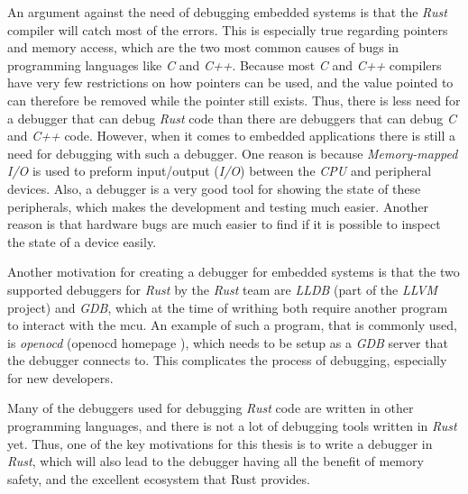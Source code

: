 An argument against the need of debugging embedded systems is that the \emph{Rust} compiler will catch most of the errors.
This is especially true regarding pointers and memory access, which are the two most common causes of bugs in programming languages like \emph{C} and \emph{C++}.
Because most \emph{C} and \emph{C++} compilers have very few restrictions on how pointers can be used, and the value pointed to can therefore be removed while the pointer still exists. 
Thus, there is less need for a debugger that can debug \emph{Rust} code than there are debuggers that can debug \emph{C} and \emph{C++} code.
However, when it comes to embedded applications there is still a need for debugging with such a debugger.
One reason is because \emph{Memory-mapped I/O} is used to preform input/output (\emph{I/O}) between the \emph{CPU} and peripheral devices.
Also, a debugger is a very good tool for showing the state of these peripherals, which makes the development and testing much easier.
Another reason is that hardware bugs are much easier to find if it is possible to inspect the state of a device easily.


Another motivation for creating a debugger for embedded systems is that the two supported debuggers for \emph{Rust} by the \emph{Rust} team are \emph{LLDB} (part of the \emph{LLVM} project) and \emph{GDB}, which at the time of writhing both require another program to interact with the \gls{mcu}.
An example of such a program, that is commonly used, is \emph{openocd} (openocd homepage \cite{openocd}), which needs to be setup as a \emph{GDB} server that the debugger connects to.
This complicates the process of debugging, especially for new developers.


Many of the debuggers used for debugging \emph{Rust} code are written in other programming languages, and there is not a lot of debugging tools written in \emph{Rust} yet.
Thus, one of the key motivations for this thesis is to write a debugger in \emph{Rust}, which will also lead to the debugger having all the benefit of memory safety, and the excellent ecosystem that Rust provides.




